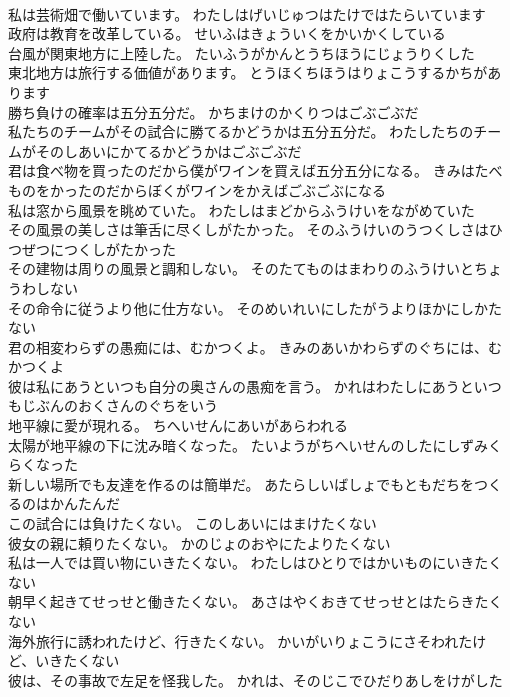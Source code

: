 \documentclass[8pt]{extreport}
\begin{document}
\begin{CJK}{UTF8}{min}
\\	私は芸術畑で働いています。	わたしはげいじゅつはたけではたらいています 
\\	政府は教育を改革している。	せいふはきょういくをかいかくしている 
\\	台風が関東地方に上陸した。	たいふうがかんとうちほうにじょうりくした 
\\	東北地方は旅行する価値があります。	とうほくちほうはりょこうするかちがあります 
\\	勝ち負けの確率は五分五分だ。	かちまけのかくりつはごぶごぶだ 
\\	私たちのチームがその試合に勝てるかどうかは五分五分だ。	わたしたちのチームがそのしあいにかてるかどうかはごぶごぶだ 
\\	君は食べ物を買ったのだから僕がワインを買えば五分五分になる。	きみはたべものをかったのだからぼくがワインをかえばごぶごぶになる 
\\	私は窓から風景を眺めていた。	わたしはまどからふうけいをながめていた 
\\	その風景の美しさは筆舌に尽くしがたかった。	そのふうけいのうつくしさはひつぜつにつくしがたかった　　 
\\	その建物は周りの風景と調和しない。	そのたてものはまわりのふうけいとちょうわしない 
\\	その命令に従うより他に仕方ない。	そのめいれいにしたがうよりほかにしかたない 
\\	君の相変わらずの愚痴には、むかつくよ。	きみのあいかわらずのぐちには、むかつくよ 
\\	彼は私にあうといつも自分の奥さんの愚痴を言う。	かれはわたしにあうといつもじぶんのおくさんのぐちをいう 
\\	地平線に愛が現れる。	ちへいせんにあいがあらわれる 
\\	太陽が地平線の下に沈み暗くなった。	たいようがちへいせんのしたにしずみくらくなった 
\\	新しい場所でも友達を作るのは簡単だ。	あたらしいばしょでもともだちをつくるのはかんたんだ 
\\	この試合には負けたくない。	このしあいにはまけたくない 
\\	彼女の親に頼りたくない。	かのじょのおやにたよりたくない 
\\	私は一人では買い物にいきたくない。	わたしはひとりではかいものにいきたくない 
\\	朝早く起きてせっせと働きたくない。	あさはやくおきてせっせとはたらきたくない 
\\	海外旅行に誘われたけど、行きたくない。	かいがいりょこうにさそわれたけど、いきたくない 
\\	彼は、その事故で左足を怪我した。	かれは、そのじこでひだりあしをけがした 

\end{CJK}
\end{document}
